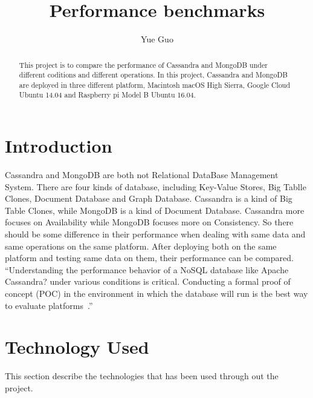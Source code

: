 
\title{Performance benchmarks}

\author{Yue Guo}

\begin{abstract}
This project is to compare the performance of Cassandra and MongoDB 
under different coditions and different operations. In this project, Cassandra
 and MongoDB are deployed in three different platform, Macintosh macOS 
 High Sierra, Google Cloud Ubuntu 14.04 and Raspberry pi Model B Ubuntu 
 16.04.
\end{abstract}



\maketitle


\section{Introduction}
Cassandra and MongoDB are both not Relational DataBase Management System. 
There are four kinds of database, including Key-Value Stores, Big Tablle 
Clones, Document Database and Graph Database. Cassandra is a kind of Big 
Table Clones, while MongoDB is a kind of Document Database. Cassandra more 
focuses on Availability while MongoDB focuses more on Consistency. So there
 should be some difference in their performance when dealing with same data 
 and same operations on the same platform. After deploying both on the same 
 platform and testing same data on them, their performance can be compared. 
 ``Understanding the performance behavior of a NoSQL database like Apache 
 Cassandra? under various conditions is critical. Conducting a formal proof 
 of concept (POC) in the environment in which the database will run is the 
 best way to evaluate platforms~\cite{hid-sp18-508-benchmarking}.''

\section{Technology Used}
This section describe the technologies that has been used through out 
the project.

